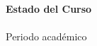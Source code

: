 \documentclass[10pt]{article}
\begin{document}
\begin{center}
    {\normalsize\bfseries \institucion}\\
    {\small \facultad}\\
    {\small \departamento}\\[8pt]

    {\large\bfseries Estado del Curso}\\[4pt]
    {\Large\bfseries \nombreCurso}\\[4pt]
    {\normalsize Periodo académico \periodoAcademico}
\end{center}


\end{document}
